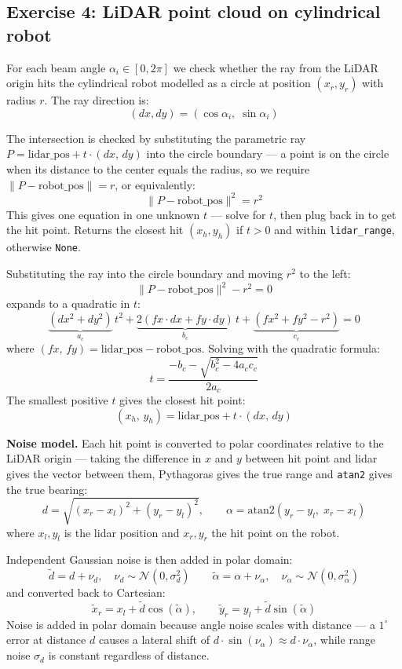 \documentclass[12pt, a4paper]{article}
\begin{document}
\subsection*{Exercise 4: LiDAR point cloud on cylindrical robot}

For each beam angle $\alpha_i \in [0, 2\pi]$ we check whether the ray from the
LiDAR origin hits the cylindrical robot modelled as a circle at position
$(x_r, y_r)$ with radius $r$. The ray direction is:
\[
  (dx, dy) = (\cos\alpha_i,\; \sin\alpha_i)
\]

The intersection is checked by substituting the parametric ray
$P = \text{lidar\_pos} + t\cdot(dx,\,dy)$ into the circle boundary ---
a point is on the circle when its distance to the center equals the radius,
so we require $\|P - \text{robot\_pos}\| = r$, or equivalently:
\[
  \|P - \text{robot\_pos}\|^2 = r^2
\]
This gives one equation in one unknown $t$ --- solve for $t$, then plug back
in to get the hit point. Returns the closest hit $(x_h, y_h)$
if $t > 0$ and within \texttt{lidar\_range}, otherwise \texttt{None}.

\begin{notebox}
Substituting the ray into the circle boundary and moving $r^2$ to the left:
\[
  \|P - \text{robot\_pos}\|^2 - r^2 = 0
\]
expands to a quadratic in $t$:
\[
  \underbrace{(dx^2+dy^2)}_{a_c}\,t^2
  + \underbrace{2(fx\cdot dx + fy\cdot dy)}_{b_c}\,t
  + \underbrace{(fx^2+fy^2-r^2)}_{c_c} = 0
\]
where $(fx,\,fy) = \text{lidar\_pos} - \text{robot\_pos}$.
Solving with the quadratic formula:
\[
  t = \frac{-b_c - \sqrt{b_c^2 - 4a_c c_c}}{2a_c}
\]
The smallest positive $t$ gives the closest hit point:
\[
  (x_h,\,y_h) = \text{lidar\_pos} + t\cdot(dx,\,dy)
\]
\end{notebox}

\textbf{Noise model.} Each hit point is converted to polar coordinates
relative to the LiDAR origin --- taking the difference in $x$ and $y$
between hit point and lidar gives the vector between them,
Pythagoras gives the true range and \texttt{atan2} gives the true bearing:
\[
  d = \sqrt{(x_r - x_l)^2 + (y_r - y_l)^2}, \qquad
  \alpha = \text{atan2}(y_r - y_l,\; x_r - x_l)
\]
where $x_l, y_l$ is the lidar position and $x_r, y_r$ the hit point on the robot.

Independent Gaussian noise is then added in polar domain:
\[
  \tilde{d} = d + \nu_d, \quad \nu_d \sim \mathcal{N}(0, \sigma_d^2)
  \qquad
  \tilde{\alpha} = \alpha + \nu_\alpha, \quad \nu_\alpha \sim \mathcal{N}(0, \sigma_\alpha^2)
\]
and converted back to Cartesian:
\[
  \tilde{x}_r = x_l + \tilde{d}\cos(\tilde{\alpha}), \qquad
  \tilde{y}_r = y_l + \tilde{d}\sin(\tilde{\alpha})
\]
Noise is added in polar domain because angle noise scales with distance ---
a $1^\circ$ error at distance $d$ causes a lateral shift of
$d\cdot\sin(\nu_\alpha) \approx d\cdot\nu_\alpha$,
while range noise $\sigma_d$ is constant regardless of distance.
\end{document}
